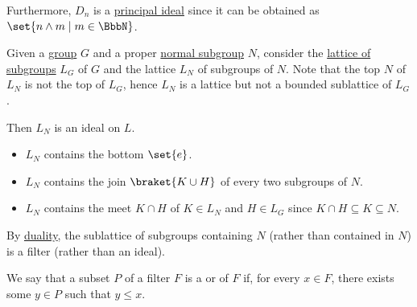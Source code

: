 \begin{example}
\begin{thmenum}
    Furthermore, \( D_n \) is a \hyperref[def:semiring_ideal]{principal ideal} since it can be obtained as \( \set{ n \wedge m \mid m \in \BbbN } \).

     Given a \hyperref[def:group]{group} \( G \) and a proper \hyperref[thm:normal_subgroup_equivalences]{normal subgroup} \( N \), consider the \hyperref[thm:substructures_form_complete_lattice]{lattice of subgroups} \( L_G \) of \( G \) and the lattice \( L_N \) of subgroups of \( N \). Note that the top \( N \) of \( L_N \) is not the top of \( L_G \), hence \( L_N \) is a lattice but not a bounded sublattice of \( L_G \).

    Then \( L_N \) is an ideal on \( L \).
    \begin{itemize}
      \item \( L_N \) contains the bottom \( \set{ e } \).
      \item \( L_N \) contains the join \( \braket{ K \cup H } \) of every two subgroups of \( N \).
      \item \( L_N \) contains the meet \( K \cap H \) of \( K \in L_N \) and \( H \in L_G \) since \( K \cap H \subseteq K \subseteq N \).
    \end{itemize}

    By \hyperref[def:semilattice/duality]{duality}, the sublattice of subgroups containing \( N \) (rather than contained in \( N \)) is a filter (rather than an ideal).
  \end{thmenum}
\end{example}

\begin{definition}\label{def:prefilter}
  We say that a subset \( P \) of a filter \( F \) is a  or  of \( F \) if, for every \( x \in F \), there exists some \( y \in P \) such that \( y \leq x \).
\end{definition}

